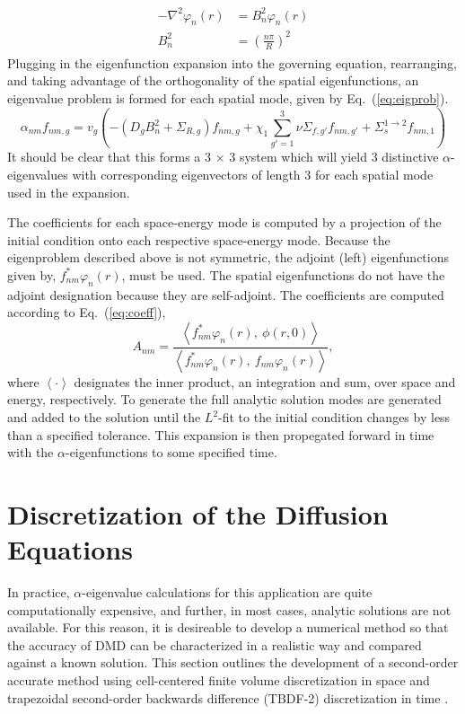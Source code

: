 \documentclass{style/nseJournal}
\newcommand{\fn}[1]{\left( #1 \right)}
\newcommand{\ave}[1]{\left\langle #1 \right\rangle}
\newcommand{\bea}{\begin{eqnarray}}
\newcommand{\eea}{\end{eqnarray}}
\newcommand{\be}{\begin{equation}}
\newcommand{\ee}{\end{equation}}
\newcommand{\LEQ}[1]{\label{eq:#1}}
\newcommand{\EQ}[1]{Eq.~(\ref{eq:#1})}
\begin{document}
\bea 
	\begin{aligned}
		- \nabla^2 \varphi_n(r) &= B_n^2 \varphi_n(r) \\
		B_n^2 &= \fn{ \frac{n \pi}{R} }^2
	\end{aligned} 
\LEQ{buckle} 
\eea
Plugging in the eigenfunction expansion into the governing equation, rearranging, and taking advantage of the orthogonality of the spatial eigenfunctions, an eigenvalue problem is formed for each spatial mode, given by \EQ{eigprob}.  
\be
	\alpha_{nm} f_{nm, g} = v_g \fn{ - \fn{ D_g B_n^2 + \Sigma_{R,g} }f_{nm, g} + \chi_1 \sum_{g' = 1}^{3} 
		\nu\Sigma_{f,g'} f_{nm, g'} + \Sigma_s^{1 \rightarrow 2} f_{nm, 1} } 
	\LEQ{eigprob}
\ee
It should be clear that this forms a 3 $\times$ 3 system which will yield 3 distinctive $\alpha$-eigenvalues with corresponding eigenvectors of length 3 for each spatial mode used in the expansion.

The coefficients for each space-energy mode is computed by a projection of the initial condition onto each respective space-energy mode.  
Because the eigenproblem described above is not symmetric, the adjoint (left) eigenfunctions given by, $f_{nm}^* \varphi_n(r)$, must be used.  
The spatial eigenfunctions do not have the adjoint designation because they are self-adjoint.  
The coefficients are computed according to \EQ{coeff},
\be
	A_{nm} = \frac{\ave{ f_{nm}^* \varphi_n(r), \ \phi(r, 0)}}{\ave{f_{nm}^* \varphi_n(r), \ f_{nm} 
		\varphi_n(r)}},
	\LEQ{coeff} 
\ee
where $\ave{\cdot}$ designates the inner product, an integration and sum, over space and energy, respectively.  
To generate the full analytic solution modes are generated and added to the solution until the $L^2$-fit to the initial condition changes by less than a specified tolerance.  
This expansion is then propegated forward in time with the $\alpha$-eigenfunctions to some specified time.  

\section{Discretization of the Diffusion Equations}
In practice,  $\alpha$-eigenvalue calculations for this application are quite computationally expensive, and further, in most cases, analytic solutions are not available.  
For this reason, it is desireable to develop a numerical method so that the accuracy of DMD can be characterized in a realistic way and compared against a known solution.  
This section outlines the development of a second-order accurate method using cell-centered finite volume discretization in space and trapezoidal second-order backwards difference (TBDF-2) discretization in time \cite{edwards2011nonlinear}.  
\end{document}
